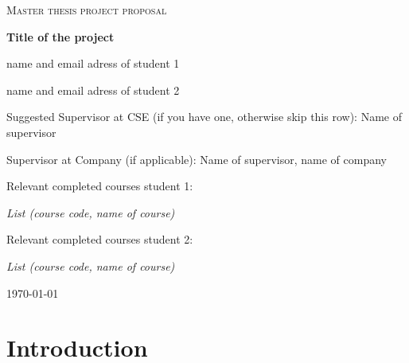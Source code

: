 \documentclass{article}
\begin{document}
\begin{titlepage}


\centering


{\scshape\LARGE Master thesis project proposal\\}

\vspace{0.5cm}

{\huge\bfseries Title of the project\\}

\vspace{2cm}

{\Large name and email adress of student 1\\}

\vspace{0.2cm}

{\Large name and email adress of student 2\\}

\vspace{1.0cm}

{\large Suggested Supervisor at CSE (if you have one, otherwise skip this row): Name of supervisor\\}

\vspace{1.5cm}

{\large Supervisor at Company (if applicable): Name of supervisor, name of company\\}

\vspace{1.5cm}

{\large Relevant completed courses student 1:\par}

{\itshape List (course code, name of course)\\}

\vspace{1.5cm}

{\large Relevant completed courses student 2:\par}

{\itshape List (course code, name of course)\\}

\vfill



\vfill

{\large \today\\}


\end{titlepage}

\section{Introduction}
\end{document}
